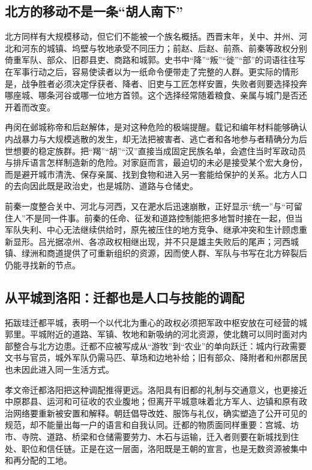 \subsection{北方的移动不是一条“胡人南下”}

北方同样有大规模移动，但它们不能被一个族名概括。西晋末年，关中、并州、河北和河东的城镇、坞壁与牧地承受不同压力；前赵、后赵、前燕、前秦等政权分别倚重军队、部众、旧郡县吏、商路和城郭。史书中“降”“叛”“徙”“部”的词语往往写在军事行动之后，容易使读者以为一纸命令便带走了完整的人群。更实际的情形是，战争胜者必须决定俘获者、降者、旧吏与工匠怎样安置，失败者则要选择投奔哪座城、哪条河谷或哪一位地方首领。这个选择经常随着粮食、亲属与城门是否还开着而改变。

冉闵在邺城称帝和后赵解体，是对这种危险的极端提醒。载记和编年材料能够确认内战暴力与大规模逃散的发生，却无法把被害者、逃亡者和各地参与者精确分为后世想要的稳定族群。把“羯”“胡”“汉”直接当成固定民族名单，会遮住当时军政动员与排斥语言怎样制造新的危险。对家庭而言，最迫切的未必是接受某个宏大身份，而是避开城市清洗、保存亲属、找到食物和进入另一套能给保护的关系。北方人口的去向因此既是政治史，也是城防、道路与仓储史。

前秦一度整合关中、河北与河西，又在淝水后迅速崩散，正好显示“统一”与“可留住人”不是同一件事。前秦的任命、征发和道路控制能把多地暂时接在一起，但当军队失利、中心无法继续供给时，原先被压住的地方竞争、继承冲突和生计顾虑重新显形。吕光据凉州、各凉政权相继出现，并不只是雄主失败后的尾声；河西城镇、绿洲和商道提供了可重新组织的资源，因而使人群、军队与书写在北方碎裂后仍能寻找新的节点。

\subsection{从平城到洛阳：迁都也是人口与技能的调配}

拓跋珪迁都平城，表明一个以代北为重心的政权必须把军政中枢安放在可经营的城郭里。平城附近的道路、军镇、牧地和新吸纳的河北资源，使北魏可以同时面对内部整合与北方边患。迁都不应被写成从“游牧”到“农业”的单向跃迁：城内行政需要文书与官员，城外军队仍需马匹、草场和边地补给；旧有部众、降附者和州郡居民也未因此进入同一生活方式。

孝文帝迁都洛阳把这种调配推得更远。洛阳具有旧都的礼制与交通意义，也更接近中原郡县、运河和可征收的农业腹地；但离开平城意味着北方军人、边镇和原有政治网络要重新被安置和解释。朝廷倡导改姓、服饰与礼仪，确实塑造了公开可见的规范，却不能量出每一户的语言和自我认同。迁都的物质面同样重要：宫城、坊市、寺院、道路、桥梁和仓储需要劳力、木石与运输，迁入者则要在新城找到住处、职位和信任链。正是在这一层面，洛阳既是王朝的宣言，也是无数资源被集中和再分配的工地。

